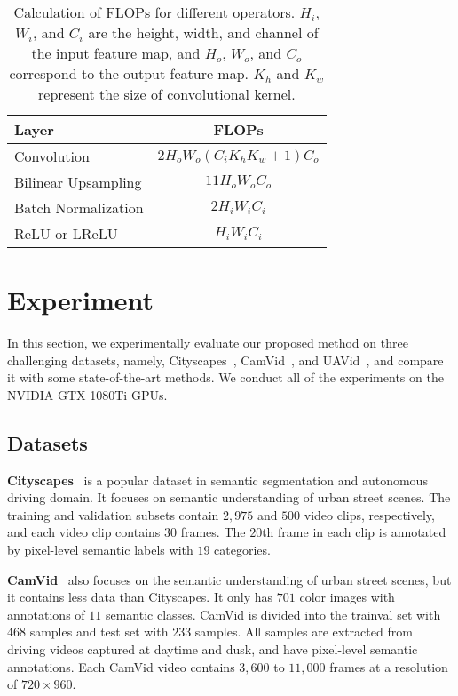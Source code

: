 \documentclass[journal]{IEEEtran}
\begin{document}
\begin{table}[t]
	\caption{Calculation of FLOPs for different operators. $H_{i}$, $W_{i}$, and $C_{i}$ are the height, width, and channel of the input feature map, and $H_{o}$, $W_{o}$, and $C_{o}$ correspond to the output feature map. $K_{h}$ and $K_{w}$ represent the size of convolutional kernel.}
	\begin{center}
		\renewcommand{\arraystretch}{1.3}
		\begin{tabular}{l|c}
			\hline
			Layer             		& FLOPs											\\
			\hline
			Convolution          	& $2H_{o}W_{o}(C_{i} K_{h}K_{w} + 1)C_{o}$  	\\
			Bilinear Upsampling 	& $11H_{o}W_{o}C_{o}$							\\
			Batch Normalization 	& $2H_{i}W_{i}C_{i}$							\\
			ReLU or LReLU 			& $H_{i}W_{i}C_{i}$								\\
			\hline
		\end{tabular}
	\end{center}
	\label{flops}
\end{table}


\section{Experiment} \label{sec:exp}
In this section, we experimentally evaluate our proposed method on three challenging datasets, namely, Cityscapes~\cite{cordts2016cityscapes}, CamVid~\cite{brostow2009semantic}, and UAVid~\cite{lyu2020uavid}, and compare it with some state-of-the-art methods. We conduct all of the experiments on the NVIDIA GTX 1080Ti GPUs. 

\subsection{Datasets}
\textbf{Cityscapes}~\cite{cordts2016cityscapes} is a popular dataset in semantic segmentation and autonomous driving domain. It focuses on semantic understanding of urban street scenes. The training and validation subsets contain $2,975$ and $500$ video clips, respectively, and each video clip contains $30$ frames. The $20${th} frame in each clip is annotated by pixel-level semantic labels with $19$ categories.

\textbf{CamVid}~\cite{brostow2009semantic} also focuses on the semantic understanding of urban street scenes, but it contains less data than Cityscapes. It only has $701$ color images with annotations of $11$ semantic classes. CamVid is divided into the trainval set with $468$ samples and test set with $233$ samples.  All samples are extracted from driving videos captured at daytime and dusk, and have pixel-level semantic annotations. Each CamVid video contains $3,600$ to $11,000$ frames at a resolution of $720\times960$.
\end{document}
